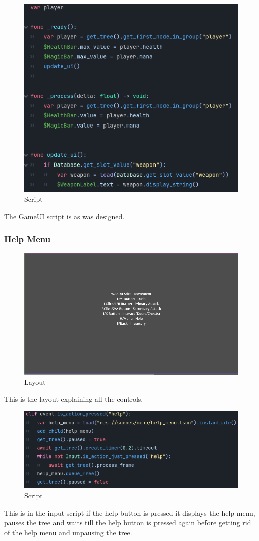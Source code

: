 \documentclass{article}
\begin{document}
        \begin{figure}[H]
                \centering
                \includegraphics[width = 0.8\columnwidth]{images/development/GameUI_script.PNG}
                \caption{Script}
        \end{figure}
        The GameUI script is as was designed.\\
        \subsubsection{Help Menu}
        \begin{figure}[H]
                \centering
                \includegraphics[width = 0.8\columnwidth]{images/development/HelpMenu_layout.PNG}
                \caption{Layout}
        \end{figure}
        This is the layout explaining all the controls.\\
        \begin{figure}[H]
                \centering
                \includegraphics[width = 0.8\columnwidth]{images/development/HelpMenu_script.PNG}
                \caption{Script}
        \end{figure}
        This is in the input script if the help button is pressed it displays the help menu, pauses the tree and waits till the help button is pressed again before getting rid of the help menu and unpausing the tree.\\
\end{document}
